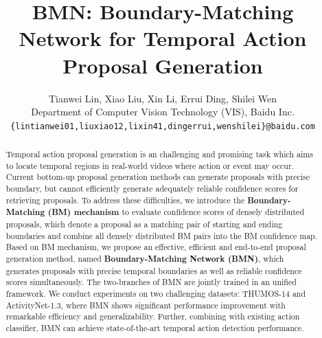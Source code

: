 \documentclass[10pt,twocolumn,letterpaper]{article}
\begin{document}
\title{BMN: Boundary-Matching Network for Temporal Action Proposal Generation}

\author{Tianwei Lin, Xiao Liu, Xin Li, Errui Ding, Shilei Wen\\
Department of Computer Vision Technology (VIS), Baidu Inc.\\
{\tt\small \{lintianwei01,liuxiao12,lixin41,dingerrui,wenshilei\}@baidu.com}
}


\maketitle
\ificcvfinal\thispagestyle{empty}\fi

\begin{abstract}

Temporal action proposal generation is an challenging and promising task which aims to locate temporal regions in real-world videos where action or event may occur.
%
Current bottom-up proposal generation methods can generate proposals with precise boundary, but cannot efficiently generate adequately reliable confidence scores for retrieving proposals.
%
To address these difficulties, we introduce the \textbf{Boundary-Matching (BM) mechanism} to evaluate confidence scores of densely distributed proposals, which denote a proposal as a matching pair of starting and ending boundaries and combine all densely distributed BM pairs into the BM confidence map.
%
Based on BM mechanism, we propose an effective, efficient and end-to-end   proposal generation method, named \textbf{Boundary-Matching Network (BMN)}, which generates proposals with precise temporal boundaries as well as reliable confidence scores simultaneously.
%
The two-branches of BMN are jointly trained in an unified framework.
%
We conduct experiments on two challenging datasets: THUMOS-14 and ActivityNet-1.3, where BMN shows significant performance improvement with remarkable efficiency and generalizability. Further, combining with existing action classifier, BMN can achieve state-of-the-art temporal action detection performance.

\end{abstract}

\end{document}
